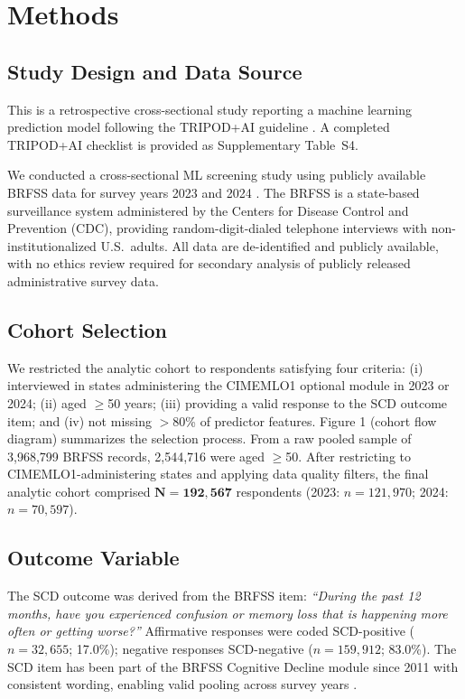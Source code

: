 \documentclass[12pt,a4paper]{article}
\begin{document}
\section{Methods}

\subsection{Study Design and Data Source}

This is a retrospective cross-sectional study reporting a machine
learning prediction model following the TRIPOD+AI guideline
\cite{Collins2024}. A completed TRIPOD+AI checklist is provided
as Supplementary Table~S4.

We conducted a cross-sectional ML screening study using publicly available
BRFSS data for survey years 2023 and 2024 \cite{CDC_BRFSS_Questionnaire}.
The BRFSS is a state-based surveillance system administered by the Centers for
Disease Control and Prevention (CDC), providing random-digit-dialed telephone
interviews with non-institutionalized U.S.\ adults. All data are de-identified
and publicly available, with no ethics review required for secondary analysis of
publicly released administrative survey data.

\subsection{Cohort Selection}

We restricted the analytic cohort to respondents satisfying four criteria:
(i) interviewed in states administering the CIMEMLO1 optional module in 2023 or
2024; (ii) aged $\geq$50 years; (iii) providing a valid response to the SCD
outcome item; and (iv) not missing $>$80\% of predictor features. Figure 1
(cohort flow diagram) summarizes the selection process. From a raw pooled sample
of 3,968,799 BRFSS records, 2,544,716 were aged $\geq$50. After restricting to
CIMEMLO1-administering states and applying data quality filters, the final
analytic cohort comprised $\mathbf{N = 192{,}567}$ respondents (2023: $n = 121{,}970$;
2024: $n = 70{,}597$).

\subsection{Outcome Variable}

The SCD outcome was derived from the BRFSS item: \textit{``During the past
12 months, have you experienced confusion or memory loss that is happening
more often or getting worse?''} Affirmative responses were coded SCD-positive
($n = 32{,}655$; 17.0\%); negative responses SCD-negative ($n = 159{,}912$;
83.0\%). The SCD item has been part of the BRFSS Cognitive Decline module since
2011 with consistent wording, enabling valid pooling across survey years
\cite{Jessen2014}.
\end{document}
